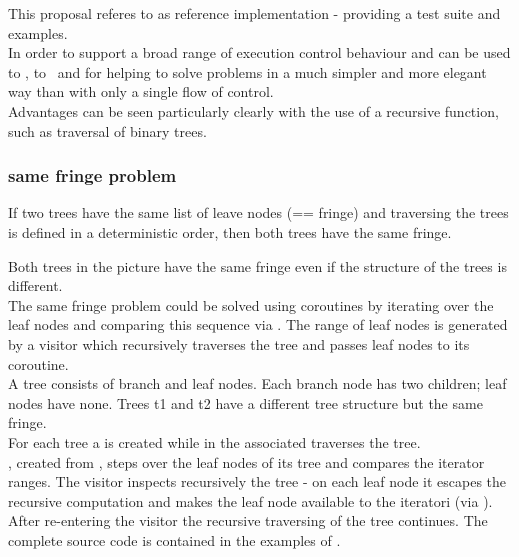 
This proposal referes to \boostcoroutine as reference implementation - providing
a test suite and examples.\\
\newline
In order to support a broad range of execution control behaviour \pushcoro and
\pullcoro can be used to \escrecloops, to \escreccomps~and for \coopmultitasking
helping to solve problems in a much simpler and more elegant way than with only
a single flow of control.\\ Advantages can be seen particularly clearly with the
use of a recursive function, such as traversal of binary trees.

\subsubsection*{same fringe problem}

If two trees have the same list of leave nodes (== fringe) and traversing the
trees is defined in a deterministic order, then both trees have the same fringe.\\


Both trees in the picture have the same fringe even if the structure of the trees
is different.\\
\newline
The same fringe problem could be solved using coroutines by iterating over the
leaf nodes and comparing this sequence via . The range of leaf
nodes is generated by a visitor which recursively traverses the tree and passes
leaf nodes to its coroutine.\\
\newline
{}
A tree consists of branch and leaf nodes. Each branch node has two children;
leaf nodes have none. Trees t1 and t2 have a different tree structure but the
same fringe.\\
For each tree a \pullcoro is created while in the associated \corofunction
{} traverses the tree.\\
\coroiterator, created from \pullcoro, steps over the leaf nodes of its tree and
 compares the iterator ranges.
\newline
\newline
{}
The visitor inspects recursively the tree - on each leaf node it escapes the
recursive computation and makes the leaf node available to the iteratori (via
\pushcoro). After re-entering the visitor the recursive traversing of the tree
continues.
\newline
The complete source code is contained in the examples of \boostcoroutine.

